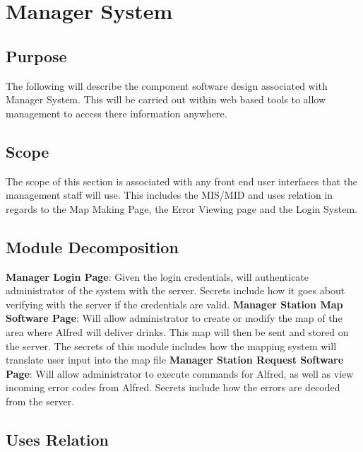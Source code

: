 \documentclass [10pt]{article}
\begin{document}
\section {Manager System}


\subsection{Purpose}
The following will describe the component software design associated with Manager System. This will be carried out within web based tools to allow management to access there information anywhere.

\subsection{Scope}

The scope of this section is associated with any front end user interfaces that the management staff will use. This includes the MIS/MID and uses relation in regards to the Map Making Page, the Error Viewing page and the Login System. 

\subsection{Module Decomposition}

\textbf{Manager Login Page}: Given the login credentials, will authenticate administrator of the system with the server. Secrets include how it goes about verifying with the server if the credentials are valid.
\textbf{Manager Station Map Software Page}: Will allow administrator to create or modify the map of the area where Alfred will deliver drinks. This map will then be sent and stored on the server. The secrets of this module includes how the mapping system will translate user input into the map file
\textbf{Manager Station Request Software Page}: Will allow administrator to execute commands for Alfred, as well as view incoming error codes from Alfred. Secrets include how the errors are decoded from the server.

\subsection{Uses Relation}
\end{document}
